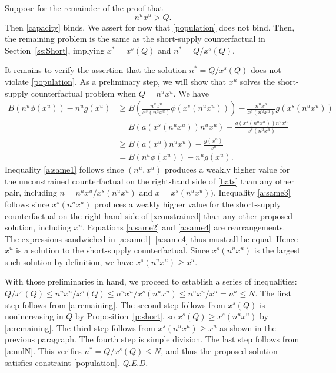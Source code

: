 \documentclass[12pt]{article}
\renewcommand{\qed}{{\it Q.E.D.}}
\newcommand{\efficacy}{\phi}
\newcommand{\general}{g}
\newcommand{\average}{a}
\newcommand{\benefit}{B}
\newcommand{\xshort}{x^{s}}
\newcommand{\xun}{x^{u}}
\newcommand{\nun}{n^{u}}
\begin{document}
Suppose for the remainder of the proof that 
\begin{equation}
\label{a:remaining}
\nun \xun > Q.
\end{equation}
Then \eqref{capacity} binds. We assert for now that \eqref{population} does not bind. Then, the remaining problem is the same
as the short-supply counterfactual in
Section~\ref{ss:Short}, implying $x^* = \xshort(Q)$ and $n^* = Q/
\xshort(Q)$. 

It remains to verify the assertion that the solution $n^* = Q / \xshort(Q)$ does not violate \eqref{population}. As a preliminary step, we will show that $\xun$ solves the short-supply counterfactual problem when $Q = \nun \xun$. We have
\begin{align}
\benefit( \nun \efficacy(\xun)) - \nun \general(\xun) & \geq \benefit \left( \frac{\nun \xun}{\xshort(\nun \xun)} \efficacy(\xshort(\nun \xun)) \right) - \frac{\nun \xun}{\xshort(\nun \xun)} \general(\xshort(\nun \xun)) \label{a:same1} \\
& = \benefit ( \average(\xshort(\nun \xun)) \nun \xun) - \frac{ \general(\xshort(\nun \xun)) \nun \xun}{\xshort(\nun \xun)} \label{a:same2} \\
& \geq \benefit(\average(\xun) \nun \xun) - \frac{\general(\xun)}{\xun} \label{a:same3} \\
& =  \benefit( \nun \efficacy(\xun)) - \nun \general(\xun). \label{a:same4}
\end{align}
Inequality \eqref{a:same1} follows since $(\nun, \xun)$ produces a weakly higher value for the unconstrained counterfactual on the right-hand side of \eqref{hats} than any other pair, including $n = \nun \xun / \xshort(\nun \xun)$ and $x = \xshort(\nun \xun))$. Inequality \eqref{a:same3} follows since $\xshort(\nun \xun)$ produces a weakly higher value for the short-supply counterfactual on the right-hand side of \eqref{xconstrained} than any other proposed solution, including $\xun$. Equations \eqref{a:same2} and \eqref{a:same4} are rearrangements. The expressions sandwiched in \eqref{a:same1}--\eqref{a:same4} thus must all be equal. Hence $\xun$ is a solution to the short-supply counterfactual. Since $\xshort(\nun \xun)$ is the largest such solution by definition, we have $\xshort(\nun \xun) \geq \xun$. 

With those preliminaries in hand, we proceed to establish a series of inequalities: $Q / \xshort(Q) \leq \nun \xun / \xshort(Q) \leq \nun \xun / \xshort(\nun \xun) \leq \nun \xun / \xun = \nun \leq N$. The first step follows from \eqref{a:remaining}. The second step follows from $\xshort(Q)$ is nonincreasing in $Q$ by Proposition~\ref{p:short}, so $\xshort(Q) \geq \xshort(\nun \xun)$ by \eqref{a:remaining}. The third step follows from $\xshort(\nun \xun) \geq \xun$ as shown in the previous paragraph. The fourth step is simple division. The last step follows from \eqref{a:nulN}. This verifies $n^* = Q / \xshort(Q) \leq N$, and thus the proposed solution satisfies constraint \eqref{population}.  \qed
\end{document}
